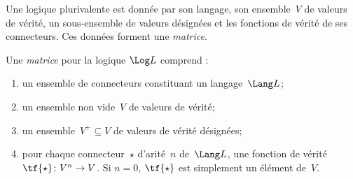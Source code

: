 \documentclass[../../../include/open-logic-section]{subfiles}
\begin{document}


Une logique plurivalente est donnée
par son langage, son ensemble~$V$ de
valeurs de vérité, un sous-ensemble
de valeurs désignées et les fonctions
de vérité de ses connecteurs. Ces
données forment une \emph{matrice}.

\begin{defn}[Matrice]
Une \emph{matrice} pour la logique
$\Log L$ comprend :
\begin{enumerate}
\item un ensemble de connecteurs
  constituant un langage~$\Lang L$;
\item un ensemble non vide~$V$
  de valeurs de vérité;
\item un ensemble~$V^+\subseteq V$
  de valeurs de vérité désignées;
\item pour chaque connecteur~$\star$
  d'arité~$n$ de~$\Lang L$, une
  fonction de vérité
  $\tf{\star}\colon V^n\to V$.
  Si $n=0$, $\tf{\star}$ est
  simplement un élément de~$V$.
\end{enumerate}
\end{defn}
\end{document}
